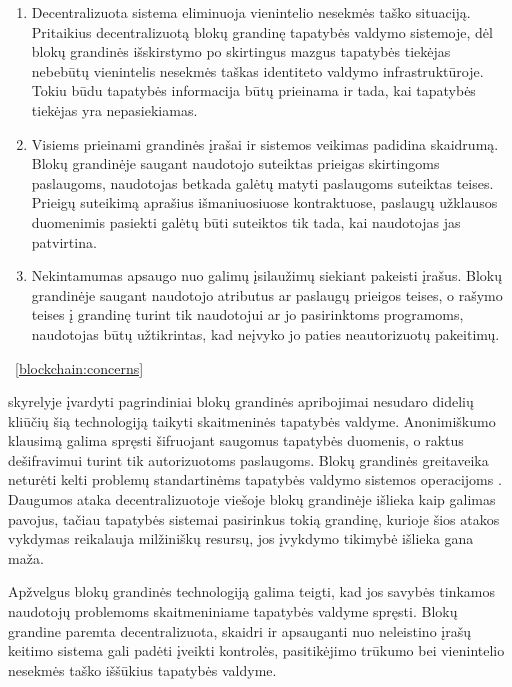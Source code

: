 \begin{enumerate}
    \item Decentralizuota sistema eliminuoja vienintelio nesekmės taško situaciją. Pritaikius decentralizuotą blokų grandinę
    tapatybės valdymo sistemoje, dėl blokų grandinės išskirstymo po skirtingus mazgus 
    tapatybės tiekėjas nebebūtų vienintelis nesekmės taškas identiteto valdymo infrastruktūroje. Tokiu būdu tapatybės informacija būtų prieinama ir tada,
    kai tapatybės tiekėjas yra nepasiekiamas.

    \item Visiems prieinami grandinės įrašai ir sistemos veikimas padidina skaidrumą. Blokų grandinėje saugant naudotojo suteiktas prieigas skirtingoms paslaugoms,
    naudotojas betkada galėtų matyti paslaugoms suteiktas teises. Prieigų suteikimą aprašius išmaniuosiuose kontraktuose, paslaugų užklausos duomenimis
    pasiekti galėtų būti suteiktos tik tada, kai naudotojas jas patvirtina.

    \item Nekintamumas apsaugo nuo galimų įsilaužimų siekiant pakeisti įrašus.
    Blokų grandinėje saugant naudotojo atributus ar paslaugų prieigos teises,
    o rašymo teises į grandinę turint tik naudotojui ar jo pasirinktoms programoms, naudotojas būtų užtikrintas, kad
    neįvyko jo paties neautorizuotų pakeitimų.

\end{enumerate}

\hypertarget{blockchain:concerns}{~\ref{blockchain:concerns}} skyrelyje įvardyti pagrindiniai blokų grandinės apribojimai nesudaro didelių kliūčių šią technologiją taikyti skaitmeninės tapatybės valdyme.  Anonimiškumo klausimą galima spręsti šifruojant saugomus tapatybės duomenis,
o raktus dešifravimui turint tik autorizuotoms paslaugoms. Blokų grandinės greitaveika neturėti kelti problemų
standartinėms tapatybės valdymo sistemos operacijoms \cite{Lo2017}. Daugumos ataka decentralizuotoje viešoje blokų grandinėje išlieka kaip galimas pavojus,
tačiau tapatybės sistemai pasirinkus tokią grandinę, kurioje šios atakos vykdymas reikalauja milžiniškų resursų, jos įvykdymo tikimybė išlieka gana maža.

Apžvelgus blokų grandinės technologiją galima teigti, kad jos savybės tinkamos naudotojų problemoms skaitmeniniame tapatybės
valdyme spręsti. Blokų grandine paremta decentralizuota, skaidri ir apsauganti nuo neleistino įrašų keitimo sistema gali padėti
įveikti kontrolės, pasitikėjimo trūkumo bei vienintelio nesekmės taško iššūkius tapatybės valdyme.

